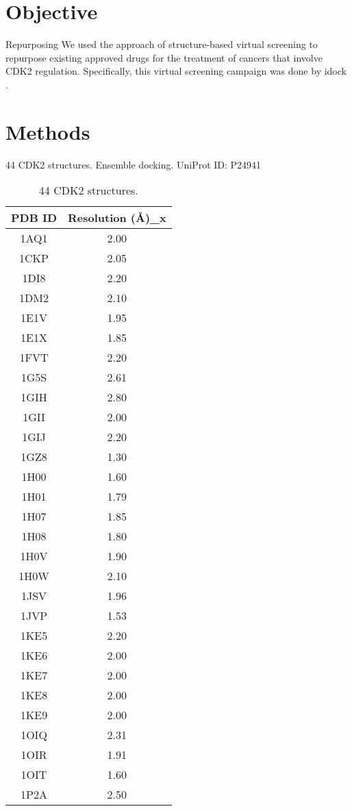 \section{Objective}

Repurposing
We used the approach of structure-based virtual screening to repurpose existing approved drugs for the treatment of cancers that involve CDK2 regulation. Specifically, this virtual screening campaign was done by idock \citep{1153}.

\section{Methods}

44 CDK2 structures. Ensemble docking. UniProt ID: P24941

\begin{table}
\caption{44 CDK2 structures.}
\label{cdk2:PDBs}
\begin{tabular}{cc}
\hline
PDB ID & Resolution (\AA)\_x\\
\hline
1AQ1 & 2.00\\
1CKP & 2.05\\
1DI8 & 2.20\\
1DM2 & 2.10\\
1E1V & 1.95\\
1E1X & 1.85\\
1FVT & 2.20\\
1G5S & 2.61\\
1GIH & 2.80\\
1GII & 2.00\\
1GIJ & 2.20\\
1GZ8 & 1.30\\
1H00 & 1.60\\
1H01 & 1.79\\
1H07 & 1.85\\
1H08 & 1.80\\
1H0V & 1.90\\
1H0W & 2.10\\
1JSV & 1.96\\
1JVP & 1.53\\
1KE5 & 2.20\\
1KE6 & 2.00\\
1KE7 & 2.00\\
1KE8 & 2.00\\
1KE9 & 2.00\\
1OIQ & 2.31\\
1OIR & 1.91\\
1OIT & 1.60\\
1P2A & 2.50\\

\end{tabular}
\end{table}
